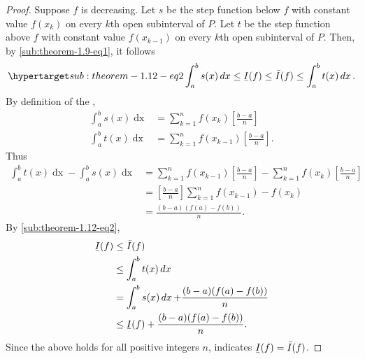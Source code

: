 \documentclass{report}
\begin{document}
\begin{proof}
      Suppose $f$ is decreasing.
      Let $s$ be the step function below $f$ with constant value $f(x_k)$
        on every $k$th open subinterval of $P$.
      Let $t$ be the step function above $f$ with constant value $f(x_{k-1})$
        on every $k$th open subinterval of $P$.
      Then, by \eqref{sub:theorem-1.9-eq1}, it follows
        \begin{equation}
          \hyperlabel{sub:theorem-1.12-eq2}
          \int_a^b s(x) \mathop{dx} \leq \ubar{I}(f)
            \leq \bar{I}(f) \leq \int_a^b t(x) \mathop{dx}.
        \end{equation}
      By definition of the ,
        \begin{align*}
          \int_a^b s(x) \mathop{dx}
            & = \sum_{k=1}^n f(x_k)\left[\frac{b - a}{n}\right] \\
          \int_a^b t(x) \mathop{dx}
            & = \sum_{k=1}^n f(x_{k-1})\left[\frac{b - a}{n}\right].
        \end{align*}
      Thus
        \begin{align*}
          \int_a^b t(x) \mathop{dx} - \int_a^b s(x) \mathop{dx}
            & = \sum_{k=1}^n f(x_{k-1})\left[\frac{b - a}{n}\right] -
                \sum_{k=1}^n f(x_k)\left[\frac{b - a}{n}\right] \\
            & = \left[\frac{b - a}{n}\right] \sum_{k=1}^n f(x_{k-1}) - f(x_k) \\
            & = \frac{(b - a)(f(a) - f(b))}{n}.
        \end{align*}
      By \eqref{sub:theorem-1.12-eq2},
        \begin{align*}
          \ubar{I}(f)
            & \leq \bar{I}(f) \\
            & \leq \int_a^b t(x) \mathop{dx} \\
            & = \int_a^b s(x) \mathop{dx} + \frac{(b - a)(f(a) - f(b))}{n} \\
            & \leq \ubar{I}(f) + \frac{(b - a)(f(a) - f(b))}{n}.
        \end{align*}
      Since the above holds for all positive integers $n$,
         indicates $\ubar{I}(f) = \bar{I}(f)$.

  \end{proof}

\subsection{}%
\end{document}
